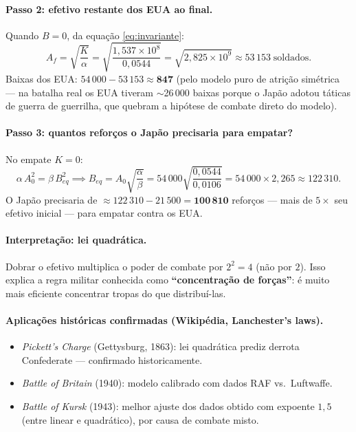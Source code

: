 \documentclass[12pt,a4paper]{article}
\theoremstyle{definition}
\begin{document}
\paragraph{Passo 2: efetivo restante dos EUA ao final.}
Quando $B = 0$, da equa\c{c}\~ao \eqref{eq:invariante}:
\begin{equation}
  A_f = \sqrt{\frac{K}{\alpha}} = \sqrt{\frac{1{,}537\times10^{8}}{0{,}0544}}
      = \sqrt{2{,}825\times10^{9}} \approx 53\,153\;\text{soldados.}
\end{equation}
Baixas dos EUA: $54\,000 - 53\,153 \approx \mathbf{847}$ (pelo modelo puro de
atri\c{c}\~ao sim\'etrica --- na batalha real os EUA tiveram $\sim$26\,000 baixas
porque o Jap\~ao adotou t\'aticas de guerra de guerrilha, que quebram a hip\'otese
de combate direto do modelo).

\paragraph{Passo 3: quantos refor\c{c}os o Jap\~ao precisaria para empatar?}
No empate $K = 0$:
\begin{equation}
  \alpha\,A_0^2 = \beta\,B_{eq}^2
  \implies
  B_{eq} = A_0\sqrt{\frac{\alpha}{\beta}}
         = 54\,000\sqrt{\frac{0{,}0544}{0{,}0106}}
         = 54\,000\times 2{,}265 \approx 122\,310.
\end{equation}
O Jap\~ao precisaria de $\approx 122\,310 - 21\,500 = \mathbf{100\,810}$ refor\c{c}os
--- mais de $5\times$ seu efetivo inicial --- para empatar contra os EUA.

\paragraph{Interpreta\c{c}\~ao: lei quadr\'atica.}
Dobrar o efetivo multiplica o poder de combate por $2^2 = 4$ (n\~ao por $2$).
Isso explica a regra militar conhecida como \textbf{``concentra\c{c}\~ao de for\c{c}as''}:
\'e muito mais eficiente concentrar tropas do que distribu\'i-las.

\paragraph{Aplica\c{c}\~oes hist\'oricas confirmadas (Wikip\'edia, Lanchester's laws).}
\begin{itemize}
  \item \textit{Pickett's Charge} (Gettysburg, 1863): lei quadr\'atica prediz
    derrota Confederate --- confirmado historicamente.
  \item \textit{Battle of Britain} (1940): modelo calibrado com dados RAF vs.\ Luftwaffe.
  \item \textit{Battle of Kursk} (1943): melhor ajuste dos dados obtido com expoente $1{,}5$
    (entre linear e quadr\'atico), por causa de combate misto.
\end{itemize}
\end{document}
